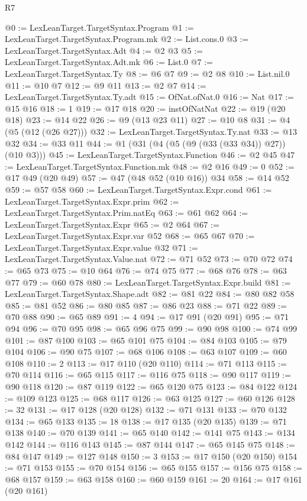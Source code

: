 \begin{lexlean}{R7}
\begin{coremodule}
@0 := LexLeanTarget.TargetSyntax.Program
@1 := LexLeanTarget.TargetSyntax.Program.mk
@2 := List.cons.{0}
@3 := LexLeanTarget.TargetSyntax.Adt
@4 := @2 @3
@5 := LexLeanTarget.TargetSyntax.Adt.mk
@6 := List.{0}
@7 := LexLeanTarget.TargetSyntax.Ty
@8 := @6 @7
@9 := @2 @8
@10 := List.nil.{0}
@11 := @10 @7
@12 := @9 @11
@13 := @2 @7
@14 := LexLeanTarget.TargetSyntax.Ty.adt
@15 := OfNat.ofNat.{0}
@16 := Nat
@17 := @15 @16
@18 := 1
@19 := @17 @18
@20 := instOfNatNat
@22 := @19 (@20 @18)
@23 := @14 @22
@26 := @9 (@13 @23 @11)
@27 := @10 @8
@31 := @4 (@5 (@12 (@26 @27)))
@32 := LexLeanTarget.TargetSyntax.Ty.nat
@33 := @13 @32
@34 := @33 @11
@44 := @1 (@31 (@4 (@5 (@9 (@33 (@33 @34)) @27)) (@10 @3)))
@45 := LexLeanTarget.TargetSyntax.Function
@46 := @2 @45
@47 := LexLeanTarget.TargetSyntax.Function.mk
@48 := @2 @16
@49 := 0
@52 := @17 @49 (@20 @49)
@57 := @47 (@48 @52 (@10 @16)) @34
@58 := @14 @52
@59 := @57 @58
@60 := LexLeanTarget.TargetSyntax.Expr.cond
@61 := LexLeanTarget.TargetSyntax.Expr.prim
@62 := LexLeanTarget.TargetSyntax.Prim.natEq
@63 := @61 @62
@64 := LexLeanTarget.TargetSyntax.Expr
@65 := @2 @64
@67 := LexLeanTarget.TargetSyntax.Expr.var @52
@68 := @65 @67
@70 := LexLeanTarget.TargetSyntax.Expr.value @32
@71 := LexLeanTarget.TargetSyntax.Value.nat
@72 := @71 @52
@73 := @70 @72
@74 := @65 @73
@75 := @10 @64
@76 := @74 @75
@77 := @68 @76
@78 := @63 @77
@79 := @60 @78
@80 := LexLeanTarget.TargetSyntax.Expr.build
@81 := LexLeanTarget.TargetSyntax.Shape.adt
@82 := @81 @22
@84 := @80 @82 @58
@85 := @81 @52
@86 := @80 @85
@87 := @86 @23
@88 := @71 @22
@89 := @70 @88
@90 := @65 @89
@91 := 4
@94 := @17 @91 (@20 @91)
@95 := @71 @94
@96 := @70 @95
@98 := @65 @96 @75
@99 := @90 @98
@100 := @74 @99
@101 := @87 @100
@103 := @65 @101 @75
@104 := @84 @103
@105 := @79 @104
@106 := @90 @75
@107 := @68 @106
@108 := @63 @107
@109 := @60 @108
@110 := 2
@113 := @17 @110 (@20 @110)
@114 := @71 @113
@115 := @70 @114
@116 := @65 @115
@117 := @116 @75
@118 := @90 @117
@119 := @90 @118
@120 := @87 @119
@122 := @65 @120 @75
@123 := @84 @122
@124 := @109 @123
@125 := @68 @117
@126 := @63 @125
@127 := @60 @126
@128 := 32
@131 := @17 @128 (@20 @128)
@132 := @71 @131
@133 := @70 @132
@134 := @65 @133
@135 := 18
@138 := @17 @135 (@20 @135)
@139 := @71 @138
@140 := @70 @139
@141 := @65 @140
@142 := @141 @75
@143 := @134 @142
@144 := @116 @143
@145 := @87 @144
@147 := @65 @145 @75
@148 := @84 @147
@149 := @127 @148
@150 := 3
@153 := @17 @150 (@20 @150)
@154 := @71 @153
@155 := @70 @154
@156 := @65 @155
@157 := @156 @75
@158 := @68 @157
@159 := @63 @158
@160 := @60 @159
@161 := 20
@164 := @17 @161 (@20 @161)

\end{coremodule}
\end{lexlean}

